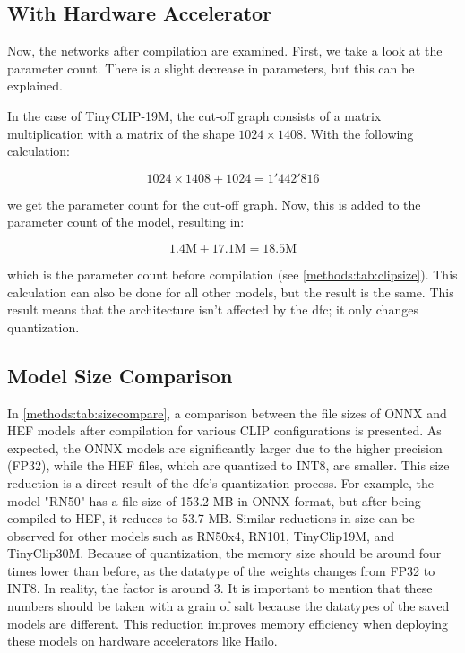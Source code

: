 \subsection{With Hardware Accelerator}

Now, the networks after compilation are examined. First, we take a look at the parameter count.
There is a slight decrease in parameters, but this can be explained.

In the case of TinyCLIP-19M, the cut-off graph consists of a matrix multiplication with a matrix of the shape \(1024 \times 1408\). With the following calculation:

\begin{equation*}
    1024 \times 1408 + 1024 = 1'442'816
\end{equation*}

we get the parameter count for the cut-off graph. Now, this is added to the parameter count of the model, resulting in:

\begin{equation*}
    1.4 \text{M} + 17.1 \text{M} = 18.5 \text{M} 
\end{equation*}

which is the parameter count before compilation (see \cref{methods:tab:clipsize}).
This calculation can also be done for all other models, but the result is the same.
This result means that the architecture isn't affected by the \acrshort{dfc}; it only changes quantization.

\subsection{Model Size Comparison}

In \cref{methods:tab:sizecompare}, a comparison between the file sizes of ONNX and HEF models after compilation for various CLIP configurations is presented.
As expected, the ONNX models are significantly larger due to the higher precision (FP32), while the HEF files, which are quantized to INT8, are smaller.
This size reduction is a direct result of the \acrshort{dfc}'s quantization process.
For example, the model "RN50" has a file size of 153.2 MB in ONNX format, but after being compiled to HEF, it reduces to 53.7 MB.
Similar reductions in size can be observed for other models such as RN50x4, RN101, TinyClip19M, and TinyClip30M.
Because of quantization, the memory size should be around four times lower than before, as the datatype of the weights changes from FP32 to INT8.
In reality, the factor is around 3.
It is important to mention that these numbers should be taken with a grain of salt because the datatypes of the saved models are different.
This reduction improves memory efficiency when deploying these models on hardware accelerators like Hailo.

